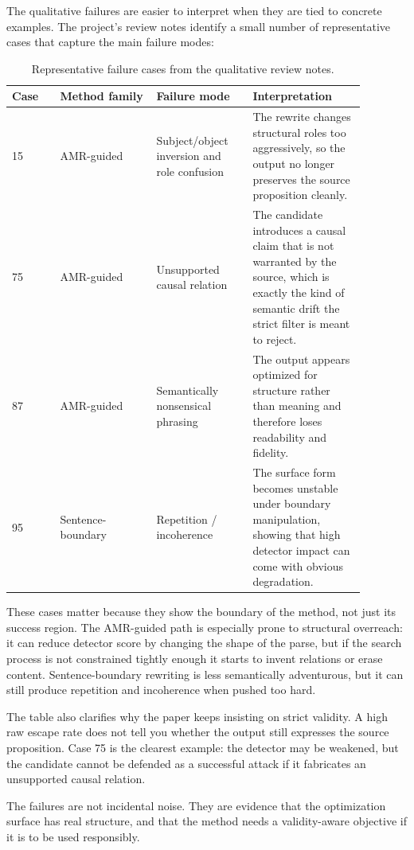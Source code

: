 The qualitative failures are easier to interpret when they are tied to concrete examples. The project's review notes identify a small number of representative cases that capture the main failure modes:

\begin{table}[H]
\centering
\begin{tabular}{p{0.12\linewidth}p{0.24\linewidth}p{0.24\linewidth}p{0.28\linewidth}}
\toprule
Case & Method family & Failure mode & Interpretation \\
\midrule
15 & AMR-guided & Subject/object inversion and role confusion & The rewrite changes structural roles too aggressively, so the output no longer preserves the source proposition cleanly. \\
75 & AMR-guided & Unsupported causal relation & The candidate introduces a causal claim that is not warranted by the source, which is exactly the kind of semantic drift the strict filter is meant to reject. \\
87 & AMR-guided & Semantically nonsensical phrasing & The output appears optimized for structure rather than meaning and therefore loses readability and fidelity. \\
95 & Sentence-boundary & Repetition / incoherence & The surface form becomes unstable under boundary manipulation, showing that high detector impact can come with obvious degradation. \\
\bottomrule
\end{tabular}
\caption{Representative failure cases from the qualitative review notes.}
\label{tab:cases}
\end{table}

These cases matter because they show the boundary of the method, not just its success region. The AMR-guided path is especially prone to structural overreach: it can reduce detector score by changing the shape of the parse, but if the search process is not constrained tightly enough it starts to invent relations or erase content. Sentence-boundary rewriting is less semantically adventurous, but it can still produce repetition and incoherence when pushed too hard.

The table also clarifies why the paper keeps insisting on strict validity. A high raw escape rate does not tell you whether the output still expresses the source proposition. Case 75 is the clearest example: the detector may be weakened, but the candidate cannot be defended as a successful attack if it fabricates an unsupported causal relation.

The failures are not incidental noise. They are evidence that the optimization surface has real structure, and that the method needs a validity-aware objective if it is to be used responsibly.
